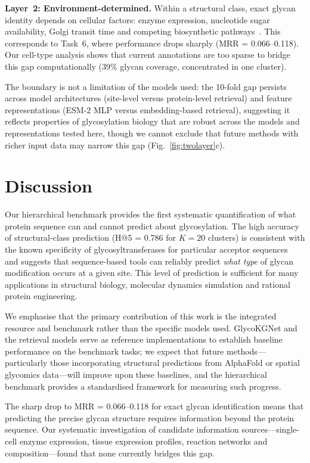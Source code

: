 \documentclass[11pt,a4paper]{article}
\begin{document}
\textbf{Layer~2: Environment-determined.} Within a structural class, exact
glycan identity depends on cellular factors: enzyme expression, nucleotide sugar
availability, Golgi transit time and competing biosynthetic
pathways~\cite{stanley2022,varki2022essentials}. This corresponds to Task~6,
where performance drops sharply (MRR = 0.066--0.118). Our cell-type analysis
shows that current annotations are too sparse to bridge this gap computationally
(39\% glycan coverage, concentrated in one cluster).

The boundary is not a limitation of the models used: the 10-fold gap persists
across model architectures (site-level versus protein-level retrieval) and
feature representations (ESM-2 MLP versus embedding-based retrieval), suggesting
it reflects properties of glycosylation biology that are robust across the models and representations tested here, though we cannot exclude that future methods with richer input data may narrow this gap
(Fig.~\ref{fig:twolayer}c).

\section{Discussion}

Our hierarchical benchmark provides the first systematic quantification of what
protein sequence can and cannot predict about glycosylation. The high accuracy of
structural-class prediction (H@5 = 0.786 for $K = 20$ clusters) is consistent
with the known specificity of glycosyltransferases for particular acceptor
sequences~\cite{schjoldager2020} and suggests that sequence-based tools can
reliably predict \textit{what type} of glycan modification occurs at a given
site. This level of prediction is sufficient for many applications in structural
biology, molecular dynamics simulation and rational protein engineering.

We emphasise that the primary contribution of this work is the
integrated resource and benchmark rather than the specific models used.
GlycoKGNet and the retrieval models serve as reference implementations
to establish baseline performance on the benchmark tasks; we expect
that future methods---particularly those incorporating structural
predictions from AlphaFold or spatial glycomics data---will improve upon
these baselines, and the hierarchical benchmark provides a standardised
framework for measuring such progress.

The sharp drop to MRR = 0.066--0.118 for exact glycan identification means that
predicting the precise glycan structure requires information beyond the protein
sequence. Our systematic investigation of candidate information
sources---single-cell enzyme expression, tissue expression profiles, reaction
networks and composition---found that none currently bridges this gap.
\end{document}
